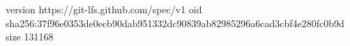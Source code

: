 version https://git-lfs.github.com/spec/v1
oid sha256:37f96e0353de0ecb90dab951332dc90839ab82985296a6cad3cbf4e280fc0b9d
size 131168
